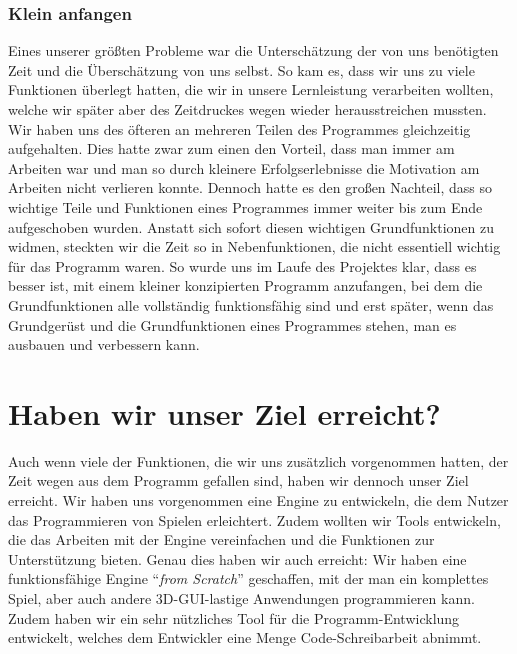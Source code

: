 \subsubsection{Klein anfangen}
\label{kleinanfangen}
Eines unserer größten Probleme war die Unterschätzung der von uns benötigten Zeit und die Überschätzung von uns selbst. So kam es, dass wir uns zu viele Funktionen überlegt hatten, die wir in unsere Lernleistung verarbeiten wollten, welche wir später aber des Zeitdruckes wegen wieder herausstreichen mussten. 
Wir haben uns des öfteren an mehreren Teilen des Programmes gleichzeitig aufgehalten. Dies hatte zwar zum einen den Vorteil, dass man immer am Arbeiten war und man so durch kleinere Erfolgserlebnisse die Motivation am Arbeiten nicht verlieren konnte. Dennoch hatte es den großen Nachteil, dass so wichtige Teile und Funktionen eines Programmes immer weiter bis zum Ende aufgeschoben wurden. Anstatt sich sofort diesen wichtigen Grundfunktionen zu widmen, steckten wir die Zeit so in Nebenfunktionen, die nicht essentiell wichtig für das Programm waren.
So wurde uns im Laufe des Projektes klar, dass es besser ist, mit einem kleiner konzipierten Programm anzufangen, bei dem die Grundfunktionen alle vollständig funktionsfähig sind und erst später, wenn das Grundgerüst und die Grundfunktionen eines Programmes stehen, man es ausbauen und verbessern kann. 

\section{Haben wir unser Ziel erreicht?}
Auch wenn viele der Funktionen, die wir uns zusätzlich vorgenommen hatten, der Zeit wegen aus dem Programm gefallen sind, haben wir dennoch unser Ziel erreicht. Wir haben uns vorgenommen eine Engine zu entwickeln, die dem Nutzer das Programmieren von Spielen erleichtert. Zudem wollten wir Tools entwickeln, die das Arbeiten mit der Engine vereinfachen und die Funktionen zur Unterstützung bieten.
Genau dies haben wir auch erreicht:
Wir haben eine funktionsfähige Engine "`\textit{from Scratch}"' geschaffen, mit der man ein komplettes Spiel, aber auch andere 3D-GUI-lastige Anwendungen programmieren kann. Zudem haben wir ein sehr nützliches Tool für die Programm-Entwicklung entwickelt, welches dem Entwickler eine Menge Code-Schreibarbeit abnimmt. 

